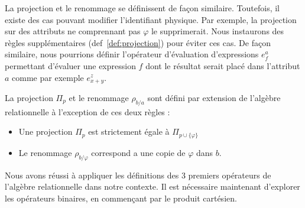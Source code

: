 La projection et le renommage se définissent de façon similaire. Toutefois, il existe des cas pouvant modifier l'identifiant physique. Par exemple, la projection sur des attributs ne comprennant pas $\varphi$ le supprimerait. Nous instaurons des règles supplémentaires (def~\ref{def:projection}) pour éviter ces cas. De façon similaire, nous pourrions définir l'opérateur d'évaluation d'expressions $e_f^a$ permettant d'évaluer une expression $f$ dont le résultat serait placé dans l'attribut $a$ comme par exemple $e_{x+y}^z$.
\begin{defi}\label{def:projection}
La projection $\Pi_p$ et le renommage $\rho_{b/a}$ sont défini par extension de l'algèbre relationnelle à l'exception de ces deux règles :
\begin{itemize}
\item Une projection $\Pi_p$ est strictement égale à $\Pi_{p\cup \{\varphi\}}$
\item Le renommage $\rho_{b/\varphi}$ correspond a une copie de $\varphi$ dans $b$.
\end{itemize}
\end{defi}

Nous avons réussi à appliquer les définitions des 3 premiers opérateurs de l'algèbre relationnelle dans notre contexte. Il est nécessaire maintenant d'explorer les opérateurs binaires, en commençant par le produit cartésien.


